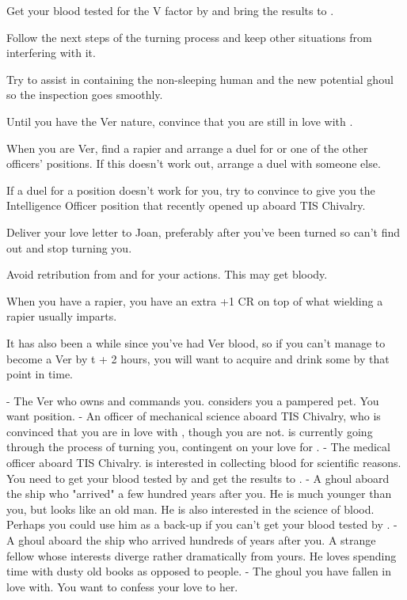 \documentclass[char]{guildcamp4}
\begin{document}
\begin{itemz}[Goals]
	\item Get your blood tested for the V factor by \cVthree{} and bring the results to \cVtwo{}.
	\item Follow the next steps of the turning process and keep other situations from interfering with it.
	\item Try to assist in containing the non-sleeping human and the new potential ghoul so the inspection goes smoothly.
	\item Until you have the Ver nature, convince \cVtwo{} that you are still in love with \cVtwo{\them}.
	\item When you are Ver, find a rapier and arrange a duel for \cVone{} or one of the other officers' positions. If this doesn't work out, arrange a duel with someone else.
	\item If a duel for a position doesn't work for you, try to convince \cVone{} to give you the Intelligence Officer position that recently opened up aboard TIS Chivalry.
	\item Deliver your love letter to Joan, preferably after you've been turned so \cVtwo{} can't find out and stop turning you.
	\item Avoid retribution from \cVone{} and \cVtwo{} for your actions. This may get bloody.
\end{itemz} 

\begin{itemz}[Notes]
	\item When you have a rapier, you have an extra +1 CR on top of what wielding a rapier usually imparts.
	\item It has also been a while since you've had Ver blood, so if you can't manage to become a Ver by t + 2 hours, you will want to acquire and drink some by that point in time.
\end{itemz}

\begin{contacts}
	\contact{\cVone{}} - The Ver who owns and commands you. \cVone{\they} considers you a pampered pet. You want \cVone{\their} position.
	\contact{\cVtwo{}} - An officer of mechanical science aboard TIS Chivalry, who is convinced that you are in love with \cVtwo{\them}, though you are not. \cVtwo{} is currently going through the process of turning you, contingent on your love for \cVtwo{\them}.
	\contact{\cVthree{}} - The medical officer aboard TIS Chivalry. \cVthree{\They} is interested in collecting blood for scientific reasons. You need to get your blood tested by \cVthree{\them} and get the results to \cVtwo{}.
	\contact{\cJames{}} - A ghoul aboard the ship who "arrived" a few hundred years after you. He is much younger than you, but looks like an old man. He is also interested in the science of blood. Perhaps you could use him as a back-up if you can't get your blood tested by \cVthree{}.
	\contact{\cRasputin{}} - A ghoul aboard the ship who arrived hundreds of years after you. A strange fellow whose interests diverge rather dramatically from yours. He loves spending time with dusty old books as opposed to people.
	\contact{\cJoan{}} - The ghoul you have fallen in love with. You want to confess your love to her. 
\end{contacts}
\end{document}
